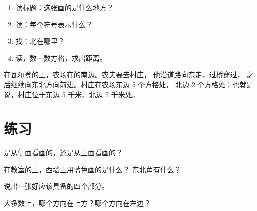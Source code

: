 \begin{method}[读地图]\label{met:g2:drawing-to-map:read}
\begin{enumerate}
  \item 读标题：这张画的是什么地方？
  \item 读：每个符号表示什么？
  \item 找：北在哪里？
  \item 读，数一数方格，求出距离。
\end{enumerate}
\end{method}

\begin{example}[从农场到村庄]\label{ex:g2:drawing-to-map:farm}
在瓦尔登的上，农场在的南边。农夫要去村庄，
他沿道路向东走，过桥穿过，
之后继续向东北方向前进。村庄在农场东边 5 个方格处，
北边 2 个方格处：也就是说，村庄位于东边
5 千米、北边 2 千米处。
\end{example}

\section{练习}

\begin{exercise}[$\star$]\label{exo:g2:drawing-to-map:1}
是从侧面看画的，还是从上面看画的？
\end{exercise}

\begin{exercise}[$\star$]\label{exo:g2:drawing-to-map:2}
在教室的上，西墙上用蓝色画的是什么？
东北角有什么？
\end{exercise}

\begin{exercise}[$\star$]\label{exo:g2:drawing-to-map:3}
说出一张好应该具备的四个部分。
\end{exercise}

\begin{exercise}[$\star$]\label{exo:g2:drawing-to-map:4}
大多数上，哪个方向在上方？哪个方向在左边？
\end{exercise}

